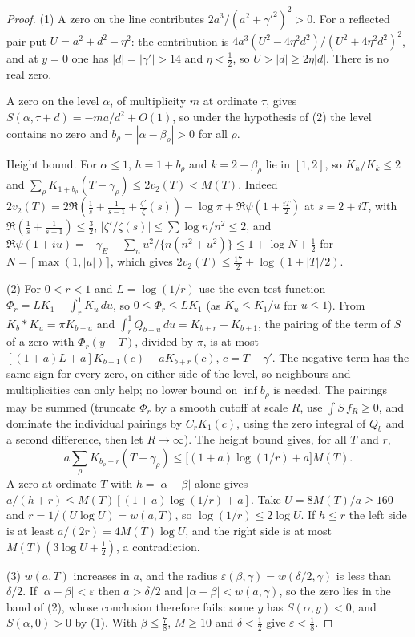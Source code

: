 \begin{proof}
(1) A zero on the line contributes $2a^3/(a^2+\gamma'^2)^2>0$. For a reflected pair put $U=a^2+d^2-\eta^2$: the contribution is $4a^3(U^2-4\eta^2d^2)/(U^2+4\eta^2d^2)^2$, and at $y=0$ one has $|d|=|\gamma'|>14$ and $\eta<\tfrac12$, so $U>|d|\ge2\eta|d|$. There is no real zero.

A zero on the level $\alpha$, of multiplicity $m$ at ordinate $\tau$, gives $S(\alpha,\tau+d)=-ma/d^2+O(1)$, so under the hypothesis of (2) the level contains no zero and $b_\rho=|\alpha-\beta_\rho|>0$ for all $\rho$.

Height bound. For $\alpha\le1$, $h=1+b_\rho$ and $k=2-\beta_\rho$ lie in $[1,2]$, so $K_h/K_k\le2$ and $\sum_\rho K_{1+b_\rho}(T-\gamma_\rho)\le2v_2(T)<M(T)$. Indeed $2v_2(T)=2\Re(\tfrac1s+\tfrac1{s-1}+\tfrac{\zeta'}\zeta(s))-\log\pi+\Re\psi(1+\tfrac{iT}2)$ at $s=2+iT$, with $\Re(\tfrac1s+\tfrac1{s-1})\le\tfrac32$, $|\zeta'/\zeta(s)|\le\sum\log n/n^2\le2$, and $\Re\psi(1+iu)=-\gamma_E+\sum_nu^2/\{n(n^2+u^2)\}\le1+\log N+\tfrac12$ for $N=\lceil\max(1,|u|)\rceil$, which gives $2v_2(T)\le\tfrac{17}2+\log(1+|T|/2)$.

(2) For $0<r<1$ and $L=\log(1/r)$ use the even test function $\Phi_r=LK_1-\int_r^1K_u\,du$, so $0\le\Phi_r\le LK_1$ (as $K_u\le K_1/u$ for $u\le1$). From $K_b*K_u=\pi K_{b+u}$ and $\int_r^1Q_{b+u}\,du=K_{b+r}-K_{b+1}$, the pairing of the term of $S$ of a zero with $\Phi_r(y-T)$, divided by $\pi$, is at most $[(1+a)L+a]K_{b+1}(c)-aK_{b+r}(c)$, $c=T-\gamma'$. The negative term has the same sign for every zero, on either side of the level, so neighbours and multiplicities can only help; no lower bound on $\inf b_\rho$ is needed. The pairings may be summed (truncate $\Phi_r$ by a smooth cutoff at scale $R$, use $\int S\,f_R\ge0$, and dominate the individual pairings by $C_rK_1(c)$, using the zero integral of $Q_b$ and a second difference, then let $R\to\infty$). The height bound gives, for all $T$ and $r$,
\[
a\sum_\rho K_{b_\rho+r}(T-\gamma_\rho)\le\big[(1+a)\log(1/r)+a\big]M(T).
\]
A zero at ordinate $T$ with $h=|\alpha-\beta|$ alone gives $a/(h+r)\le M(T)[(1+a)\log(1/r)+a]$. Take $U=8M(T)/a\ge160$ and $r=1/(U\log U)=w(a,T)$, so $\log(1/r)\le2\log U$. If $h\le r$ the left side is at least $a/(2r)=4M(T)\log U$, and the right side is at most $M(T)(3\log U+\tfrac12)$, a contradiction.

(3) $w(a,T)$ increases in $a$, and the radius $\varepsilon(\beta,\gamma)=w(\delta/2,\gamma)$ is less than $\delta/2$. If $|\alpha-\beta|<\varepsilon$ then $a>\delta/2$ and $|\alpha-\beta|<w(a,\gamma)$, so the zero lies in the band of (2), whose conclusion therefore fails: some $y$ has $S(\alpha,y)<0$, and $S(\alpha,0)>0$ by (1). With $\beta\le\tfrac78$, $M\ge10$ and $\delta<\tfrac12$ give $\varepsilon<\tfrac18$.
\end{proof}

